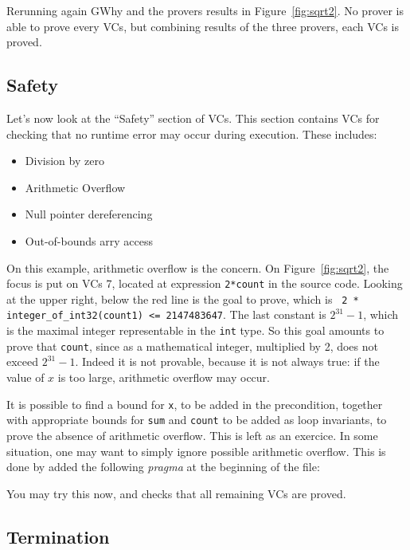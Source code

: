\documentclass[a4paper,11pt,twoside,openright]{report}
\begin{document}
Rerunning again GWhy and the provers results in
Figure~\ref{fig:sqrt2}. No prover is able to prove every VCs, but
combining results of the three provers, each VCs is proved.

\subsection*{Safety}

Let's now look at the ``Safety'' section of VCs. This section contains
VCs for checking that no runtime error may occur during
execution. These includes:
\begin{itemize}
\item Division by zero
\item Arithmetic Overflow
\item Null pointer dereferencing
\item Out-of-bounds arry access
\end{itemize}

On this example, arithmetic overflow is the concern. On
Figure~\ref{fig:sqrt2}, the focus is put on VCs 7, located at
expression \texttt{2*count} in the source code. Looking at the upper
right, below the red line is the goal to prove, which is \texttt{ 2 *
  integer\_of\_int32(count1) <= 2147483647}. The last constant is
$2^{31}-1$, which is the maximal integer representable in the
\texttt{int} type. So this goal amounts to prove that \texttt{count},
since as a mathematical integer, multiplied by 2, does not exceed
$2^{31}-1$. Indeed it is not provable, because it is not always true:
if the value of $x$ is too large, arithmetic overflow may occur.

It is possible to find a bound for \texttt{x}, to be added in the
precondition, together with appropriate bounds for \texttt{sum} and
\texttt{count} to be added as loop invariants, to prove the absence of
arithmetic overflow. This is left as an exercice. In some situation,
one may want to simply ignore possible arithmetic overflow. This is
done by added the following \emph{pragma} at the beginning of the
file:


You may try this now, and checks that all remaining VCs are proved.

\subsection*{Termination}
\end{document}
